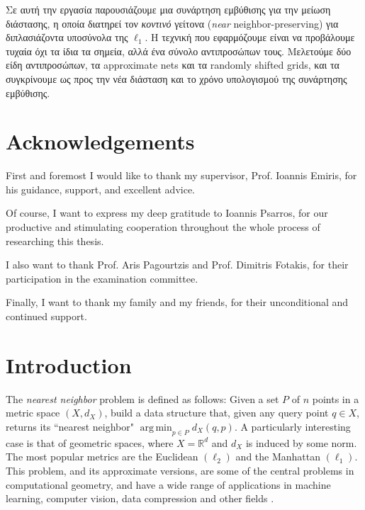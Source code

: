 \documentclass[10pt,a4paper,twoside]{book}
\newcommand{\rd}{\mathbb{R}^{d}}
\DeclareMathOperator*{\argmin}{arg\,min}
\theoremstyle{definition}
\theoremstyle{remark}
\begin{document}
Σε αυτή την εργασία παρουσιάζουμε μια συνάρτηση εμβύθισης για την μείωση διάστασης, η οποία διατηρεί τον \textit{κοντινό} γείτονα (\textit{near} neighbor-preserving) για διπλασιάζοντα υποσύνολα της $\ell_1$. Η τεχνική που εφαρμόζουμε είναι να προβάλουμε τυχαία όχι τα ίδια τα σημεία, αλλά ένα σύνολο αντιπροσώπων τους. Μελετούμε δύο είδη αντιπροσώπων, τα approximate nets και τα randomly shifted grids, και τα συγκρίνουμε ως προς την νέα διάσταση και το χρόνο υπολογισμού της συνάρτησης εμβύθισης.

\clearpage

\thispagestyle{empty}
\null 
\clearpage

\chapter*{Acknowledgements}

First and foremost I would like to thank my supervisor, Prof. Ioannis Emiris, for his guidance, support, and excellent advice.

Of course, I want to express my deep gratitude to Ioannis Psarros, for our productive and stimulating cooperation throughout the whole process of researching this thesis.

I also want to thank Prof. Aris Pagourtzis and Prof. Dimitris Fotakis, for their participation in the examination committee.

Finally, I want to thank my family and my friends, for their unconditional and continued support.

\clearpage

\thispagestyle{empty}
\null 
\clearpage


\clearpage
\thispagestyle{empty}

\pagestyle{fancy}

\tableofcontents
\clearpage

\thispagestyle{empty}
\null 
\clearpage


\chapter{Introduction}

The \textit{nearest neighbor} problem is defined as follows: Given a set $P$ of $n$ points in a metric space $(X,d_X)$, build a data structure that, given any query point $q \in X$, returns its ``nearest neighbor" $\argmin_{p \in P} d_X(q,p)$. A particularly interesting case is that of geometric spaces, where $X = \rd$ and $d_X$ is induced by some norm. The most popular metrics are the Euclidean $(\ell_2)$ and the Manhattan $(\ell_1)$. This problem, and its approximate versions, are some of the central problems in computational geometry, and have a wide range of applications in machine learning, computer vision, data compression and other fields \cite{SDI06, Dub10, MO15}. 
\end{document}
